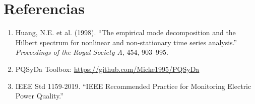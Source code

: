 \documentclass[12pt,a4paper]{article}
\begin{document}
\section*{Referencias}

\begin{enumerate}
    \item Huang, N.E. et al. (1998). ``The empirical mode decomposition and the Hilbert spectrum for nonlinear and non-stationary time series analysis.'' \textit{Proceedings of the Royal Society A}, 454, 903--995.
    \item PQSyDa Toolbox: \url{https://github.com/Micke1995/PQSyDa}
    \item IEEE Std 1159-2019. ``IEEE Recommended Practice for Monitoring Electric Power Quality.''
\end{enumerate}
\end{document}
